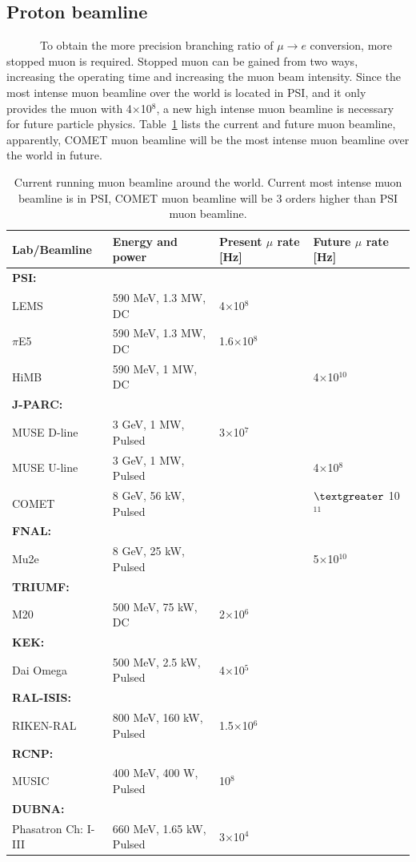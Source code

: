 \subsection{Proton beamline}
~~~~~~To obtain the more precision branching ratio of $\mu \rightarrow e$ conversion, more stopped muon is required.
Stopped muon can be gained from two ways, increasing the operating time and increasing the muon beam intensity.
Since the most intense muon beamline over the world is located in PSI, and it only provides the muon with 4$\times$10$^8$, a new high intense muon beamline is necessary for future particle physics.
Table~\ref{protonbeam} lists the current and future muon beamline, apparently, COMET muon beamline will be the most intense muon beamline over the world in future.
\begin{table}[H]
 \centering
 \begin{tabular}{llll} \hline \hline
 Lab/Beamline & Energy and power & Present $\mu$ rate [Hz] & Future $\mu$ rate [Hz] \\ \hline
 \textbf{PSI:} & & & \\
 LEMS & 590 MeV, 1.3 MW, DC & 4$\times$10$^8$ & \\
 $\pi$E5 & 590 MeV, 1.3 MW, DC & 1.6$\times$10$^8$ & \\
 HiMB & 590 MeV, 1 MW, DC & & 4$\times$10$^{10}$ \\ \hline
 \textbf{J-PARC:} & & & \\
 MUSE D-line & 3 GeV, 1 MW, Pulsed & 3$\times$10$^7$ & \\
 MUSE U-line & 3 GeV, 1 MW, Pulsed & & 4$\times$10$^8$ \\
 COMET & 8 GeV, 56 kW, Pulsed & & $\textgreater$ 10$^{11}$ \\ \hline
 \textbf{FNAL:} & & & \\
 Mu2e & 8 GeV, 25 kW, Pulsed & & 5$\times$10$^{10}$ \\ \hline
 \textbf{TRIUMF:} & & & \\
 M20 & 500 MeV, 75 kW, DC & 2$\times$10$^6$ & \\ \hline
 \textbf{KEK:} & & & \\
 Dai Omega & 500 MeV, 2.5 kW, Pulsed & 4$\times$10$^5$ & \\ \hline
 \textbf{RAL-ISIS:} & & & \\
 RIKEN-RAL & 800 MeV, 160 kW, Pulsed & 1.5$\times$10$^6$ & \\ \hline
 \textbf{RCNP:} & & & \\
 MUSIC & 400 MeV, 400 W, Pulsed & 10$^8$ & \\ \hline
 \textbf{DUBNA:} & & & \\
 Phasatron Ch: I-III & 660 MeV, 1.65 kW, Pulsed & 3$\times$10$^4$ & \\ \hline \hline
 \end{tabular}
 \caption{Current running muon beamline around the world. Current most intense muon beamline is in PSI, COMET muon beamline will be 3 orders higher than PSI muon beamline.}
 \label{protonbeam}
\end{table}

